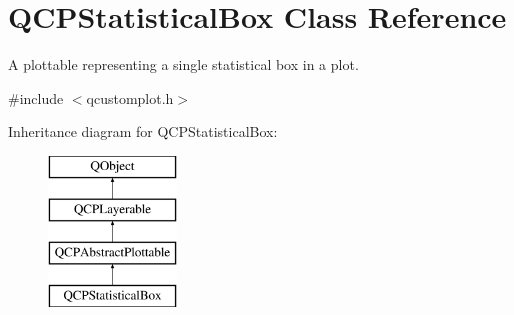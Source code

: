 \hypertarget{class_q_c_p_statistical_box}{}\section{Q\+C\+P\+Statistical\+Box Class Reference}
\label{class_q_c_p_statistical_box}


A plottable representing a single statistical box in a plot.  




{\ttfamily \#include $<$qcustomplot.\+h$>$}

Inheritance diagram for Q\+C\+P\+Statistical\+Box\+:\begin{figure}[H]
\begin{center}
\leavevmode
\includegraphics[height=4.000000cm]{class_q_c_p_statistical_box}
\end{center}
\end{figure}
